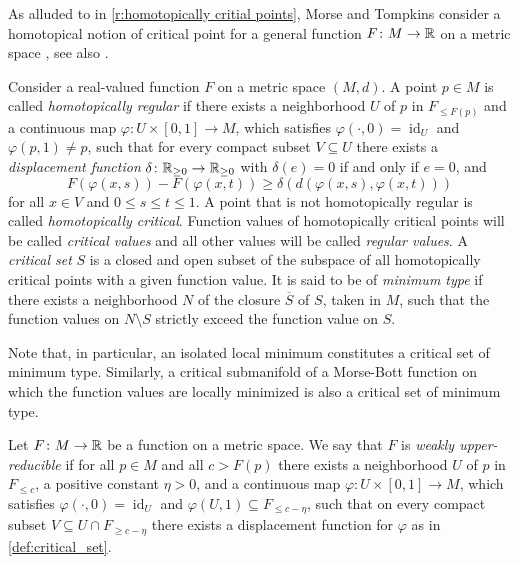 As alluded to in \cref{r:homotopically critial points}, Morse and Tompkins consider a homotopical notion of critical point for a general function $F \colon M \to \mathbb{R}$ on a metric space \cite[p.~445]{Morse.1939}, see also \cite{Morse.1943}.

\begin{defi}
\label{def:critical_set}
	Consider a real-valued function $F$ on a metric space $(M,d)$.
	A point $p \in M$ is called \emph{homotopically regular} if there exists a neighborhood $U$ of $p$ in $F_{\leq F(p)}$ and a continuous map $\varphi \colon U \times [0,1] \to M$, which satisfies $\varphi(\cdot, 0) = \operatorname{id}_U$ and $\varphi(p,1) \neq p$, such that for every compact subset $V \subseteq U$ there exists a \emph{displacement function} $\delta \colon \mathbb{R}_{\geq 0} \to \mathbb{R}_{\geq 0}$ with
	$\delta(e) = 0$ if and only if $e = 0$, and
	\[
	F(\varphi(x,s)) - F(\varphi(x,t)) \geq \delta(d(\varphi(x,s),\varphi(x,t)))
	\]
	for all $x \in V$ and $0 \leq s \leq t \leq 1$.
	A point that is not homotopically regular is called \emph{homotopically critical}.
	Function values of homotopically critical points will be called \emph{critical values} and all other values will be called \emph{regular values}.
	A \emph{critical set} $S$ is a closed and open subset of the subspace of all homotopically critical points with a given function value.
	It is said to be of \emph{minimum type} if there exists a neighborhood $N$ of the closure $\overline{S}$ of $S$, taken in $M$, such that the function values on $N \setminus S$ strictly exceed the function value on $S$.
\end{defi}

Note that, in particular, an isolated local minimum constitutes a critical set of minimum type. Similarly, a critical submanifold of a Morse-Bott function on which the function values are locally minimized is also a critical set of minimum type.

\begin{defi}
\label{def:upper_reducible}
    Let $F \colon M \to \mathbb{R}$ be a function on a metric space. 
    We say that $F$ is \emph{weakly upper-reducible} if for all $p \in M$ and all $c > F(p)$ there exists a neighborhood $U$ of $p$ in $F_{\leq c}$, a positive constant $\eta > 0$, and a continuous map $\varphi \colon U \times [0,1] \to M$, which satisfies $\varphi(\cdot, 0) = \operatorname{id}_U$ and $\varphi(U,1) \subseteq F_{\leq c-\eta}$, such that on every compact subset $V \subseteq U \cap F_{\geq c - \eta}$ there exists a displacement function for $\varphi$ as in \cref{def:critical_set}.
\end{defi}

